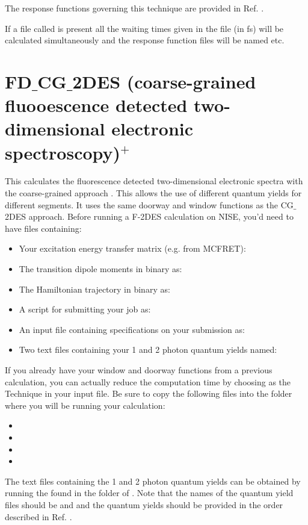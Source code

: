 The response functions governing this technique are provided in
Ref. \cite{Zhong.2024.J.Chem.TheoryComput..20.6111}.

If a file called  is present all the waiting times given in the
file (in fs) will be calculated simultaneously and the response function files will
be named  etc.

\section{FD$\_$CG$\_$2DES (coarse-grained fluooescence detected two-dimensional electronic spectroscopy)$^{+}$}
This calculates the fluorescence detected two-dimensional electronic
spectra with the
coarse-grained approach \cite{Gonzalez-Migoni.2026.J.Chem.Phys..164.104112}. This
allows the use of different quantum yields for different segments.
It uses the same
doorway and window functions as the CG$\_$2DES approach.
Before running a F-2DES calculation on NISE, you'd need to have
files containing:
\begin{itemize}
\item Your excitation energy transfer matrix (e.g. from MCFRET):
\item The transition dipole moments in binary as: 
\item The Hamiltonian trajectory in binary as: 
\item A script for submitting your job as: 
\item An input file containing specifications on your submission as:
\item Two text files containing your 1 and 2 photon quantum
yields named: 
\end{itemize}
If you already have your window and doorway functions from a
previous calculation, you can actually reduce the computation time
by choosing  as the Technique in your
input file. Be sure to copy the following files into the folder
where you will be running your calculation:
\begin{itemize}
\item {}
\item {}
\item {}
\item {}
\end{itemize}
The text files containing the 1 and 2 photon quantum yields can be
obtained by running the  found in the
 folder of . Note that the names of the quantum yield files should be
 and  and the quantum yields should be provided in the order
described in Ref. \cite{Gonzalez-Migoni.2026.J.Chem.Phys..164.104112}.

